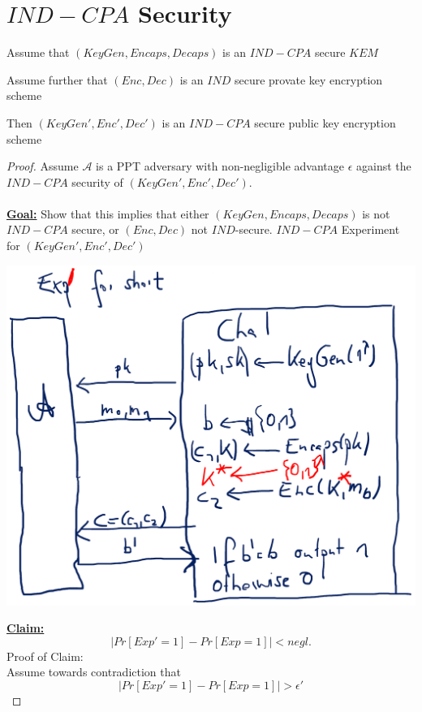 \section{$IND-CPA$ Security}
    \begin{theorem}\label{thm8.3}
        \item Assume that $(KeyGen,Encaps,Decaps)$ is an $IND-CPA$ secure $KEM$
        \item Assume further that $(Enc,Dec)$ is an $IND$ secure provate key encryption scheme
        \item Then $(KeyGen',Enc',Dec')$ is an $IND-CPA$ secure public key encryption scheme
    \end{theorem}
    \begin{proof}
        Assume $\mathcal{A}$ is a PPT adversary with non-negligible advantage $\epsilon$ against the $IND-CPA$ security of $(KeyGen',Enc',Dec')$.\\\\
        \textbf{\underline{Goal:}} Show that this implies that either $(KeyGen,Encaps,Decaps)$ is not $IND-CPA$ secure, or $(Enc,Dec)$ not $IND$-secure.
        $IND-CPA$ Experiment for $(KeyGen',Enc',Dec')$
    	\begin{center}
    		\includegraphics[width=160mm]{Graphics/Hybrid Encryption/he5.png}
    	\end{center}
    	\textbf{\underline{Claim:}}
    	    $$|Pr[Exp'=1]-Pr[Exp=1]| < negl.$$
    	Proof of Claim:\\
    	Assume towards contradiction that
    	$$|Pr[Exp'=1]-Pr[Exp=1]| > \epsilon'$$

\end{proof}
